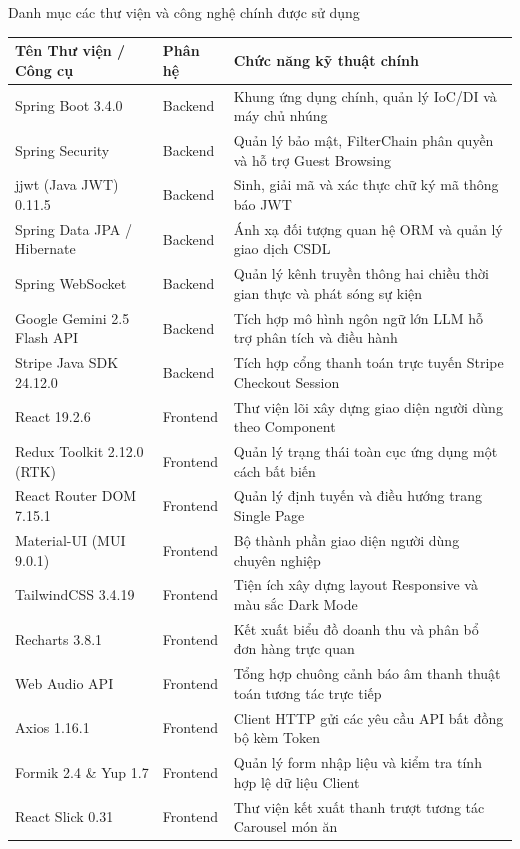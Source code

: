 \documentclass{uetgraduation}
\begin{document}
\begin{table}[!htbp]{Danh mục các thư viện và công nghệ chính được sử dụng}
\centering
\small
\begin{tabularx}{\textwidth}{|>{\raggedright\arraybackslash}p{4.2cm}|>{\raggedright\arraybackslash}p{2.2cm}|>{\raggedright\arraybackslash}X|}
\hline
\textbf{Tên Thư viện / Công cụ} & \textbf{Phân hệ} & \textbf{Chức năng kỹ thuật chính} \\ \hline
Spring Boot 3.4.0 & Backend & Khung ứng dụng chính, quản lý IoC/DI và máy chủ nhúng \\ \hline
Spring Security & Backend & Quản lý bảo mật, FilterChain phân quyền và hỗ trợ Guest Browsing \\ \hline
jjwt (Java JWT) 0.11.5 & Backend & Sinh, giải mã và xác thực chữ ký mã thông báo JWT \\ \hline
Spring Data JPA / Hibernate & Backend & Ánh xạ đối tượng quan hệ ORM và quản lý giao dịch CSDL \\ \hline
Spring WebSocket & Backend & Quản lý kênh truyền thông hai chiều thời gian thực và phát sóng sự kiện \\ \hline
Google Gemini 2.5 Flash API & Backend & Tích hợp mô hình ngôn ngữ lớn LLM hỗ trợ phân tích và điều hành \\ \hline
Stripe Java SDK 24.12.0 & Backend & Tích hợp cổng thanh toán trực tuyến Stripe Checkout Session \\ \hline
React 19.2.6 & Frontend & Thư viện lõi xây dựng giao diện người dùng theo Component \\ \hline
Redux Toolkit 2.12.0 (RTK) & Frontend & Quản lý trạng thái toàn cục ứng dụng một cách bất biến \\ \hline
React Router DOM 7.15.1 & Frontend & Quản lý định tuyến và điều hướng trang Single Page \\ \hline
Material-UI (MUI 9.0.1) & Frontend & Bộ thành phần giao diện người dùng chuyên nghiệp \\ \hline
TailwindCSS 3.4.19 & Frontend & Tiện ích xây dựng layout Responsive và màu sắc Dark Mode \\ \hline
Recharts 3.8.1 & Frontend & Kết xuất biểu đồ doanh thu và phân bổ đơn hàng trực quan \\ \hline
Web Audio API & Frontend & Tổng hợp chuông cảnh báo âm thanh thuật toán tương tác trực tiếp \\ \hline
Axios 1.16.1 & Frontend & Client HTTP gửi các yêu cầu API bất đồng bộ kèm Token \\ \hline
Formik 2.4 \& Yup 1.7 & Frontend & Quản lý form nhập liệu và kiểm tra tính hợp lệ dữ liệu Client \\ \hline
React Slick 0.31 & Frontend & Thư viện kết xuất thanh trượt tương tác Carousel món ăn \\ \hline
\end{tabularx}
\end{table}
\end{document}
